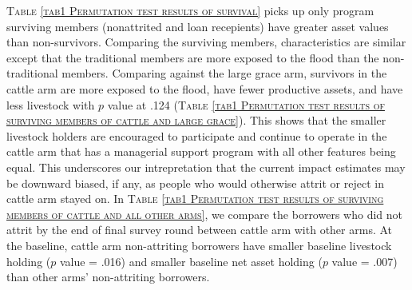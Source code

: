 	\textsc{\normalsize Table \ref{tab1 Permutation test results of survival}} picks up only program surviving members (nonattrited and loan recepients) have greater asset values than non-survivors. Comparing the surviving members, characteristics are similar except that the \textsf{traditional} members are more exposed to the flood than the non-\textsf{traditional} members. Comparing against the large grace arm, survivors in the cattle arm are more exposed to the flood, have fewer productive assets, and have less livestock with $p$ value at .124 (\textsc{\normalsize Table \ref{tab1 Permutation test results of surviving members of cattle and large grace}}). This shows that the smaller livestock holders are encouraged to participate and continue to operate in the cattle arm that has a managerial support program with all other features being equal. This underscores our intrepretation that the current impact estimates may be downward biased, if any, as people who would otherwise attrit or reject in cattle arm stayed on. In \textsc{\normalsize Table \ref{tab1 Permutation test results of surviving members of cattle and all other arms}}, we compare the borrowers who did not attrit by the end of final survey round between \textsf{cattle} arm with other arms. At the baseline, \textsf{cattle} arm non-attriting borrowers have smaller baseline livestock holding ($p$ value = .016) and smaller baseline net asset holding ($p$ value = .007) than other arms' non-attriting borrowers.

	

